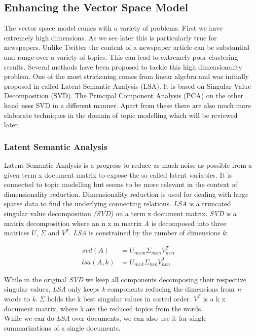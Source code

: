   \subsection{Enhancing the Vector Space Model}

    The vector space model comes with a variety of problems. First we have extremely high dimensions. As we see later this is particularly true for newspapers. Unlike Twitter the content of a newspaper article can be substantial and range over a variety of topics. This can lead to extremely poor clustering results. Several methods have been proposed to tackle this high dimensionality problem. One of the most strickening comes from linear algebra and was initially proposed in \cite{DeerwesterLSI1990} called Latent Semantic Analysis (LSA). It is based on Singular Value Decomposition (SVD). The Principal Component Analysis (PCA) on the other hand uses SVD in a different manner. Apart from these there are also much more elaborate techniques in the domain of topic modelling which will be reviewed later.

    \subsubsection{Latent Semantic Analysis}\label{lsa_section}
      Latent Semantic Analysis is a progress to reduce as much noise as possible from a given term x document matrix to expose the so called latent variables. It is connected to topic modelling but seems to be more relevant in the context of dimensionality reduction. Dimensionality reduction is used for dealing with large sparse data to find the underlying connecting relations. \emph{LSA} is a truncated singular value decomposition \emph{(SVD)} on a term x document matrix. \emph{SVD} is a matrix decomposition where an n x m matrix \emph{A} is decomposed into three matrices $U$, $\Sigma$ and $V^{T}$. \emph{LSA} is constrained by the number of dimensions \emph{k}:

      \begin{align*}
        svd(A) &= U_{mxm}\Sigma_{mxn} V^{T}_{nxn} \\
        lsa(A, k) &= U_{mxk}\Sigma_{kxk} V^{T}_{kxn}
      \end{align*}

      While in the original \emph{SVD} we keep all components decomposing their respective singular values, \emph{LSA} only keeps \emph{k} components reducing the dimensions from \emph{n} words to \emph{k}. $\Sigma$ holds the k best singular values in sorted order. $V^{T}$ is a k x document matrix, where k are the reduced topics from the words.\\
      While we can do \emph{LSA} over documents, we can also use it for single summarizations of a single documents.

